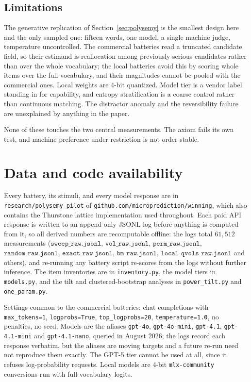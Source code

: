 \documentclass[11pt]{article}
\begin{document}
\subsection*{Limitations}

The generative replication of Section~\ref{sec:polysemy} is the smallest design
here and the only sampled one: fifteen words, one model, a single machine judge,
temperature uncontrolled. The commercial batteries read a truncated candidate
field, so their estimand is reallocation among previously serious candidates
rather than over the whole vocabulary; the local batteries avoid this by scoring
whole items over the full vocabulary, and their magnitudes cannot be pooled with
the commercial ones. Local weights are 4-bit quantized. Model tier is a vendor
label standing in for capability, and entropy stratification is a coarse control
rather than continuous matching. The distractor anomaly and the reversibility
failure are unexplained by anything in the paper.

None of these touches the two central measurements. The axiom fails its own
test, and machine preference under restriction is not order-stable.

\section*{Data and code availability}

Every battery, its stimuli, and every model response are in
\texttt{research/polysemy\_pilot} of \texttt{github.com/microprediction/winning},
which also contains the Thurstone lattice implementation used throughout.
Each paid API response is written to an append-only JSONL log before anything
is computed from it, so all derived numbers are recomputable offline: the logs
total $61{,}512$ measurements ($\texttt{sweep\_raw.jsonl}$,
$\texttt{vol\_raw.jsonl}$, $\texttt{perm\_raw.jsonl}$,
$\texttt{random\_raw.jsonl}$, $\texttt{exact\_raw.jsonl}$,
$\texttt{bm\_raw.jsonl}$, $\texttt{local\_qvols\_raw.jsonl}$ and others), and
re-running any battery script re-scores from the logs without further
inference. The item inventories are in \texttt{inventory.py}, the model tiers
in \texttt{models.py}, and the tilt and clustered-bootstrap analyses in
\texttt{power\_tilt.py} and \texttt{one\_param.py}.

Settings common to the commercial batteries: chat completions with
\texttt{max\_tokens=1}, \texttt{logprobs=True}, \texttt{top\_logprobs=20},
\texttt{temperature=1.0}, no penalties, no seed. Models are the aliases
\texttt{gpt-4o}, \texttt{gpt-4o-mini}, \texttt{gpt-4.1},
\texttt{gpt-4.1-mini} and \texttt{gpt-4.1-nano}, queried in August 2026; the
logs record each response verbatim, but the aliases are moving targets and a
future re-run need not reproduce them exactly. The GPT-5 tier cannot be used
at all, since it refuses log-probability requests. Local models are 4-bit
\texttt{mlx-community} conversions run with full-vocabulary logits.
\end{document}
